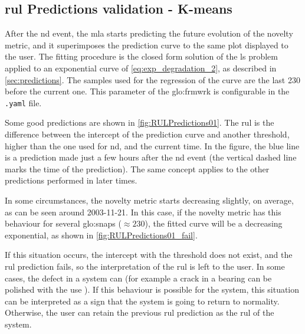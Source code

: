 \subsection{\gls{rul} Predictions validation - K-means}
After the \gls{nd} event, the \gls{mla} starts predicting the future evolution of the novelty metric, and it superimposes the prediction curve to the same plot displayed to the user. The fitting procedure is the closed form solution of the \gls{ls} problem applied to an exponential curve of \autoref{eq:exp_degradation_2}, as described in \autoref{sec:predictions}. The samples used for the regression of the curve are the last 230 before the current one. This parameter of the \gls{glo:frmwrk} is configurable in the \texttt{.yaml} file. 

Some good predictions are shown in \autoref{fig:RULPredictions01}. The \gls{rul} is the difference between the intercept of the prediction curve and another threshold, higher than the one used for \gls{nd}, and the current time. In the figure, the blue line is a prediction made just a few hours after the \gls{nd} event (the vertical dashed line marks the time of the prediction). The same concept applies to the other predictions performed in later times.

In some circumstances, the novelty metric starts decreasing slightly, on average, as can be seen around 2003-11-21. In this case, if the novelty metric has this behaviour for several \gls{glo:snap}s ($\approx 230$), the fitted curve will be a decreasing exponential, as shown in \autoref{fig:RULPredictions01_fail}. 

If this situation occurs, the intercept with the threshold does not exist, and the \gls{rul} prediction fails, so the interpretation of the \gls{rul} is left to the user. In some cases, the defect in a system can  (for example a crack in a bearing can be polished with the use \cite{IMSpaper}). If this behaviour is possible for the system, this situation can be interpreted as a sign that the system is going to return to normality. Otherwise, the user can retain the previous \gls{rul} prediction as the \gls{rul} of the system.

